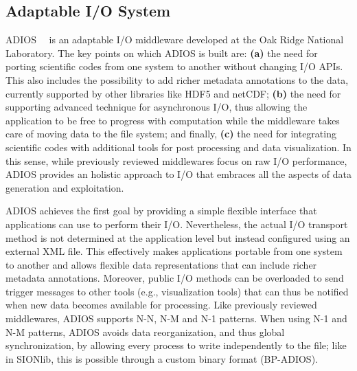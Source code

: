 \subsection{Adaptable I/O System}
ADIOS~\cite{Lofstead2008}~\cite{Liu2014} is an adaptable I/O middleware developed at the Oak Ridge National Laboratory. The key points on which ADIOS is built are: \textbf{(a)} the need for porting scientific codes 
from one system to another without changing I/O APIs. This also includes the possibility to add richer metadata annotations to the data, currently supported by other libraries like HDF5 and netCDF; \textbf{(b)} the 
need for supporting advanced technique for asynchronous I/O, thus allowing the application to be free to progress with computation while the middleware takes care of moving data to the file system; and finally, 
\textbf{(c)} the need for integrating scientific codes with additional tools for post processing and data visualization. In this sense, while previously reviewed middlewares focus on raw I/O performance, ADIOS provides 
an holistic approach to I/O that embraces all the aspects of data generation and exploitation.

ADIOS achieves the first goal by providing a simple flexible interface that applications can use to perform their I/O. Nevertheless, the actual I/O transport method is not determined at the application level but instead 
configured using an external XML file. This effectively makes applications portable from one system to another and allows flexible data representations that can include richer metadata annotations. 
Moreover, public I/O methods can be overloaded to send trigger messages to other tools (e.g., visualization tools) that can thus be notified when new data becomes available for processing. Like previously reviewed middlewares, 
ADIOS supports N-N, N-M and N-1 patterns. When using N-1 and N-M patterns, ADIOS avoids data reorganization, and thus global synchronization, by allowing every process to write independently to the file; like in SIONlib, 
this is possible through a custom binary format (BP-ADIOS).
